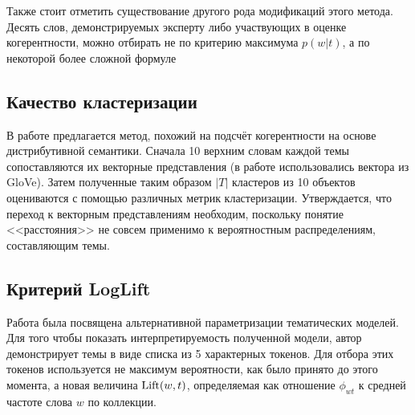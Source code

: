 Также стоит отметить существование другого рода модификаций этого метода. Десять слов, демонстрируемых эксперту либо участвующих в оценке когерентности, можно отбирать не по критерию максимума $p(w|t)$, а по некоторой более сложной формуле \cite{blei2009topic} \cite{ldavis2014}





\subsection{Качество кластеризации}

В работе \cite{krasnov19clustering} предлагается метод, похожий на подсчёт когерентности на основе дистрибутивной семантики. Сначала 10 верхним словам каждой темы сопоставляются их векторные представления (в работе использовались вектора из GloVe). Затем полученные таким образом $|T|$ кластеров из 10 объектов оцениваются с помощью различных метрик кластеризации. Утверждается, что переход к векторным представлениям необходим, поскольку понятие <<расстояния>> не совсем применимо к вероятностным распределениям, составляющим темы.


\subsection{Критерий LogLift}
Работа \cite{taddy2012estimation} была посвящена альтернативной параметризации тематических моделей. Для того чтобы показать интерпретируемость полученной модели, автор демонстрирует темы в виде списка из 5 характерных токенов. Для отбора этих токенов используется не максимум вероятности, как было принято до этого момента, а новая величина $\textup{Lift}(w, t)$, определяемая как отношение $\phi_{wt}$ к средней частоте слова $w$ по коллекции.

